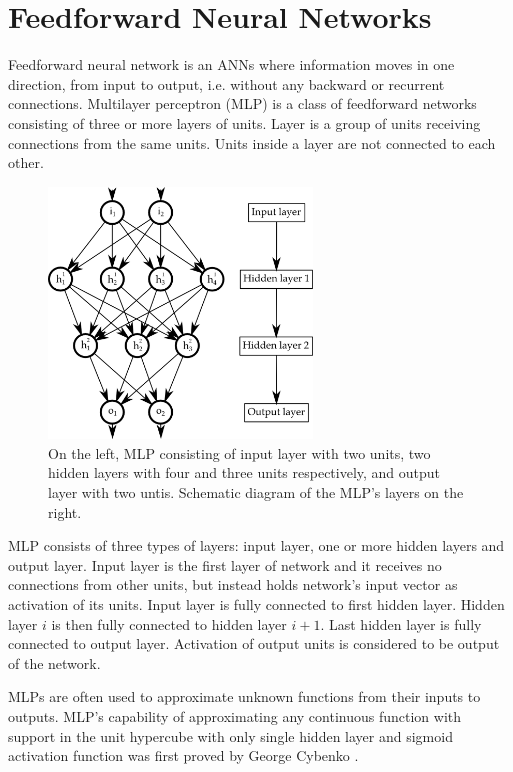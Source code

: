 \documentclass[12pt,oneside]{fithesis2}
\begin{document}
\section{Feedforward Neural Networks}
Feedforward neural network is an ANNs where information moves in one direction, from input to output, i.e. without any backward or recurrent connections. Multilayer perceptron (MLP) is a class of feedforward networks consisting of three or more layers of units. Layer is a group of units receiving connections from the same units. Units inside a layer are not connected to each other. \par
	\begin{figure}[ht]
		\centering
		\includegraphics[width=265px]{mlp.png}
		\caption{On the left, MLP consisting of input layer with two units, two hidden layers with four and three units respectively, and output layer with two untis. Schematic diagram of the MLP's layers on the right.}
	\end{figure}
MLP consists of three types of layers: input layer, one or more hidden layers and output layer. Input layer is the first layer of network and it receives no connections from other units, but instead holds network's input vector as activation of its units. Input layer is fully connected to first hidden layer. Hidden layer $i$ is then fully connected to hidden layer $i + 1$. Last hidden layer is fully connected to output layer. Activation of output units is considered to be output of the network. \par
MLPs are often used to approximate unknown functions from their inputs to outputs. MLP's capability of approximating any continuous function with support in the unit hypercube with only single hidden layer and sigmoid activation function was first proved by George Cybenko \cite{universal-approx-theorem}.
\end{document}
